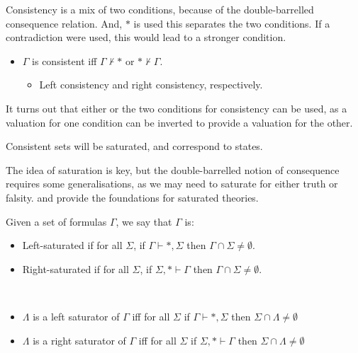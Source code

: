\documentclass[10pt]{article}
\begin{document}
\begin{definition}[Consistency]
  Consistency is a mix of two conditions, because of the double-barrelled consequence relation.
  And, \(\ast\) is used this separates the two conditions.
  If a contradiction were used, this would lead to a stronger condition.
  \begin{itemize}
  \item \(\Gamma\) is consistent iff \(\Gamma \nvdash \ast\) or \(\ast \nvdash \Gamma\).
    \begin{itemize}
    \item Left consistency and right consistency, respectively.
    \end{itemize}
  \end{itemize}
  It turns out that either or the two conditions for consistency can be used, as a valuation for one condition can be inverted to provide a valuation for the other.
\end{definition}

Consistent sets will be saturated, and correspond to states.

The idea of saturation is key, but the double-barrelled notion of consequence requires some generalisations, as we may need to saturate for either truth or falsity.
\textcite{Thomason:1968aa} and \textcite{Aczel:1968aa} provide the foundations for saturated theories.

\begin{definition}[Saturation]
  Given a set of formulas \(\Gamma\), we say that \(\Gamma\) is:
  \begin{itemize}
  \item Left-saturated if for all \(\Sigma\), if \(\Gamma \vdash \ast, \Sigma\) then \(\Gamma \cap \Sigma \ne \emptyset\).
  \item Right-saturated if for all \(\Sigma\), if \(\Sigma, \ast \vdash \Gamma\) then \(\Gamma \cap \Sigma \ne \emptyset\).
  \end{itemize}
\end{definition}

\begin{definition}[Saturators]
  \mbox{ }
  \begin{itemize}
  \item \(\Lambda\) is a left saturator of \(\Gamma\) iff for all \(\Sigma\) if \(\Gamma \vdash \ast, \Sigma\) then \(\Sigma \cap \Lambda \ne \emptyset\)
  \item \(\Lambda\) is a right saturator of \(\Gamma\) iff for all \(\Sigma\) if \(\Sigma, \ast \vdash \Gamma\) then \(\Sigma \cap \Lambda \ne \emptyset\)
  \end{itemize}
\end{definition}
\end{document}

